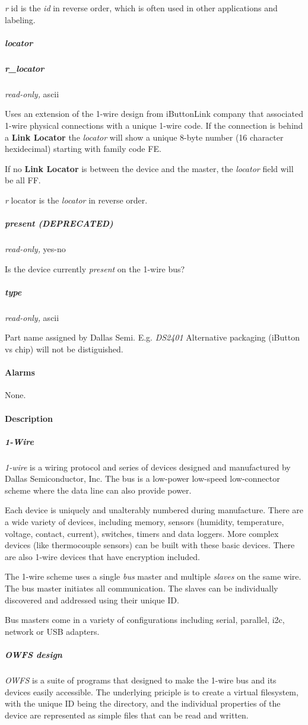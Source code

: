 \textit{r} id is the \textit{id} in reverse order, which is often used in other applications
and labeling. 
\subparagraph*{locator}
\subparagraph*{r\_locator}\textit{read-only,} ascii 

Uses an extension of the 1-wire design from iButtonLink company that associated
1-wire physical connections with a unique 1-wire code. If the connection is
behind a \textbf{Link Locator} the \textit{locator} will show a unique 8-byte number (16 character
hexidecimal) starting with family code FE. 

If no \textbf{Link Locator} is between the device and the master, the \textit{locator} field
will be all FF. 

\textit{r} locator is the \textit{locator} in reverse order. 
\subparagraph*{present (DEPRECATED)}\textit{read-only,}
yes-no 

Is the device currently \textit{present} on the 1-wire bus? 
\subparagraph*{type}\textit{read-only,} ascii 

Part name assigned by Dallas Semi. E.g. \textit{DS2401} Alternative packaging (iButton
vs chip) will not be distiguished.  
\paragraph*{Alarms}
None. 
\paragraph*{Description}
          
\subparagraph*{1-Wire}\textit{1-wire}
 is a wiring protocol and series of devices designed and manufactured by
Dallas Semiconductor, Inc. The bus is a low-power low-speed low-connector scheme
where the data line can also provide power. 

Each device is uniquely and
unalterably numbered during manufacture. There are a wide variety of devices,
including memory, sensors (humidity, temperature, voltage, contact, current),
switches, timers and data loggers. More complex devices (like thermocouple
sensors) can be built with these basic devices. There are also 1-wire devices
that have encryption included. 

The 1-wire scheme uses a single  \textit{bus} master
and multiple \textit{slaves} on the same wire. The bus master initiates all communication.
The slaves can be  individually discovered and addressed using their unique
ID. 

Bus masters come in a variety of configurations including serial, parallel,
i2c, network or USB adapters. 
\subparagraph*{OWFS design}\textit{OWFS} is a suite of programs that
designed to make the 1-wire bus and its devices easily accessible. The underlying
priciple is to create a virtual filesystem, with the unique ID being the
directory, and the individual properties of the device are represented
as simple files that can be read and written. 

